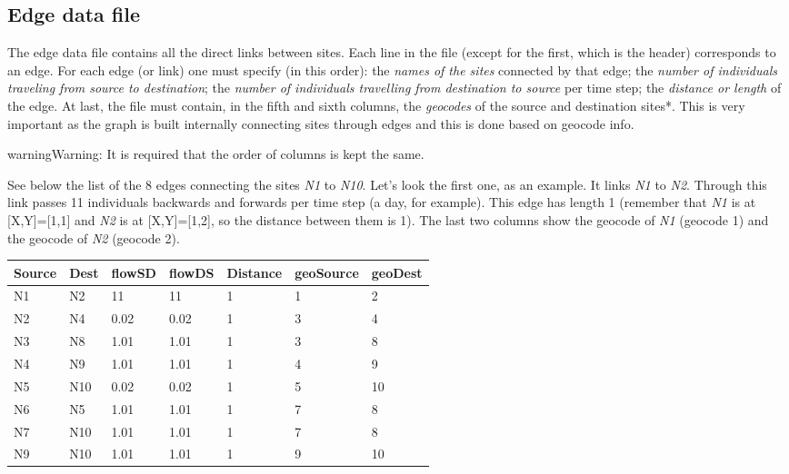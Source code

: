\documentclass[a4paper,10pt,english]{sphinxmanual}
\begin{document}
\subsection{Edge data file}
\label{using:edge-data-file}
The edge data file contains all the direct links between sites. Each line in the file (except for the first, which is the header) corresponds to an edge. For each edge (or link) one must specify (in this order): the \emph{names of the sites} connected by that edge; the \emph{number of individuals traveling from source to destination}; the \emph{number of individuals travelling from destination to source} per time step; the \emph{distance or length} of the edge. At last, the file must contain, in the fifth and sixth columns, the \emph{geocodes} of the source and destination sites*. This is very important as the graph is built internally connecting sites through edges and this is done based on geocode info.

\begin{notice}{warning}{Warning:}
It is required that the order of columns is kept the same.
\end{notice}

See below the list of the 8 edges connecting the sites \emph{N1} to \emph{N10}. Let's look the first one, as an example. It links \emph{N1} to \emph{N2}. Through this link passes 11 individuals backwards and forwards per time step (a day, for example). This edge has length 1 (remember that \emph{N1} is at {[}X,Y{]}={[}1,1{]} and \emph{N2} is at {[}X,Y{]}={[}1,2{]}, so the distance between them is 1). The last two columns show the geocode of \emph{N1} (geocode 1) and the geocode of \emph{N2} (geocode 2).

\begin{tabulary}{\linewidth}{|L|L|L|L|L|L|L|}
\hline
\textsf{\relax 
Source
} & \textsf{\relax 
Dest
} & \textsf{\relax 
flowSD
} & \textsf{\relax 
flowDS
} & \textsf{\relax 
Distance
} & \textsf{\relax 
geoSource
} & \textsf{\relax 
geoDest
}\\
\hline
N1
 & 
N2
 & 
11
 & 
11
 & 
1
 & 
1
 & 
2
\\

N2
 & 
N4
 & 
0.02
 & 
0.02
 & 
1
 & 
3
 & 
4
\\

N3
 & 
N8
 & 
1.01
 & 
1.01
 & 
1
 & 
3
 & 
8
\\

N4
 & 
N9
 & 
1.01
 & 
1.01
 & 
1
 & 
4
 & 
9
\\

N5
 & 
N10
 & 
0.02
 & 
0.02
 & 
1
 & 
5
 & 
10
\\

N6
 & 
N5
 & 
1.01
 & 
1.01
 & 
1
 & 
7
 & 
8
\\

N7
 & 
N10
 & 
1.01
 & 
1.01
 & 
1
 & 
7
 & 
8
\\

N9
 & 
N10
 & 
1.01
 & 
1.01
 & 
1
 & 
9
 & 
10
\\
\hline\end{tabulary}
\end{document}

